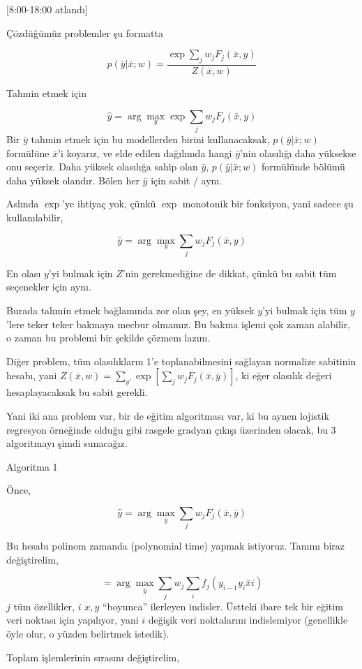 \documentclass[12pt,fleqn]{article}\usepackage{../../common}
\begin{document}
[8:00-18:00 atlandı]

Çözdüğümüz problemler şu formatta

$$
p(\bar{y}|\bar{x};w) = \frac{\exp \sum_j w_j F_j (\bar{x},y)}{Z(\bar{x},w)}
$$

Tahmin etmek için 

$$ \hat{y} = \arg\max_{y} \exp \sum_j w_j F_j(\bar{x},y)$$ Bir $\bar{y}$ tahmin
etmek için bu modellerden birini kullanacaksak, $p(\bar{y}|\bar{x};w)$ formülüne
$\bar{x}$'i koyarız, ve elde edilen dağılımda hangi $\bar{y}$'nin olasılığı daha
yüksekse onu seçeriz. Daha yüksek olasılığa sahip olan $\bar{y}$,
$p(\bar{y}|\bar{x};w)$ formülünde bölümü daha yüksek olandır. Bölen her
$\bar{y}$ için sabit / aynı.

Aslında $\exp$'ye ihtiyaç yok, çünkü $\exp$ monotonik bir fonksiyon, yani
sadece şu kullanılabilir,

$$ \hat{y} = \arg\max_{y}  \sum_j w_j F_j(\bar{x},y)$$

En olası $y$'yi bulmak için $Z$'nin gerekmediğine de dikkat, çünkü bu sabit
tüm seçenekler için aynı.

Burada tahmin etmek bağlamında zor olan şey, en yüksek $y$'yi bulmak
için tüm $y$'lere teker teker bakmaya mecbur olmamız. Bu bakma işlemi
çok zaman alabilir, o zaman bu problemi bir şekilde çözmem lazım. 

Diğer problem, tüm olasılıkların 1'e toplanabilmesini sağlayan normalize
sabitinin hesabı, yani $Z(\bar{x},w) = \sum_{y'}\exp [ \sum_j w_j F_j(\bar{x},\bar{y})]$, 
ki eğer olasılık değeri hesaplayacaksak bu sabit gerekli. 

Yani iki ana problem var, bir de eğitim algoritması var, ki bu aynen
lojistik regresyon örneğinde olduğu gibi rasgele gradyan çıkışı üzerinden
olacak, bu 3 algoritmayı şimdi sunacağız. 

Algoritma 1

Önce,

$$ \hat{y} = \arg\max_{\bar{y}}  \sum_j w_j F_j(\bar{x},\bar{y})$$

Bu hesabı polinom zamanda (polynomial time) yapmak istiyoruz. Tanımı biraz
değiştirelim, 

$$ = \arg\max_{\bar{y}}  \sum_j w_j \sum_i f_j(y_{i-1}y_i \bar{x} i )$$
$j$ tüm özellikler, $i$ $x,y$ ``boyunca'' ilerleyen indisler. Üstteki ibare
tek bir eğitim veri noktası için yapılıyor, yani $i$ değişik veri
noktalarını indislemiyor (genellikle öyle olur, o yüzden belirtmek
istedik). 

Toplam işlemlerinin sırasını değiştirelim, 
\end{document}
